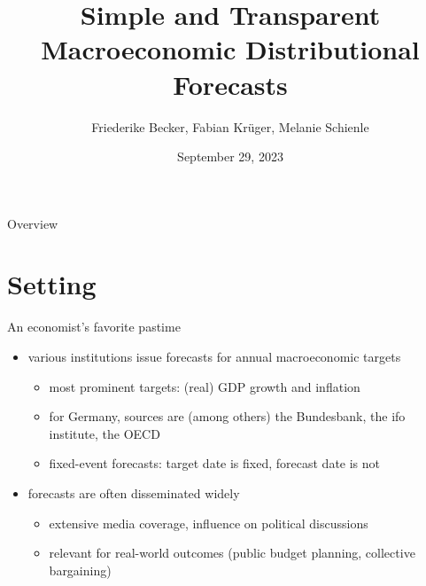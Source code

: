\documentclass[en]{sdqbeamer}
\title[Simple Prediction Intervals]{Simple and Transparent Macroeconomic Distributional Forecasts}
\subtitle{}
\author[Friederike Becker, Fabian Krüger, Melanie Schienle]{Friederike Becker, Fabian Krüger, Melanie Schienle}
\date[29.\,9.\,2023]{September 29, 2023}
\begin{document}
 
\KITtitleframe

\begin{frame}{Overview}
\tableofcontents
\end{frame}

\section{Setting}


\begin{frame}{An economist's favorite pastime}
	\begin{itemize}
	    \item various institutions issue forecasts for annual macroeconomic targets
     \begin{itemize}
        \item most prominent targets: (real) GDP growth and inflation
        \item for Germany, sources are (among others) the Bundesbank, the ifo institute, the OECD
         \item fixed-event forecasts: target date is fixed, forecast date is not
     \end{itemize}
     \item forecasts are often disseminated widely
     \begin{itemize}
         \item extensive media coverage, influence on political discussions
         \item relevant for real-world outcomes (public budget planning, collective bargaining)
     \end{itemize}
	\end{itemize}
\end{frame}
\end{document}
